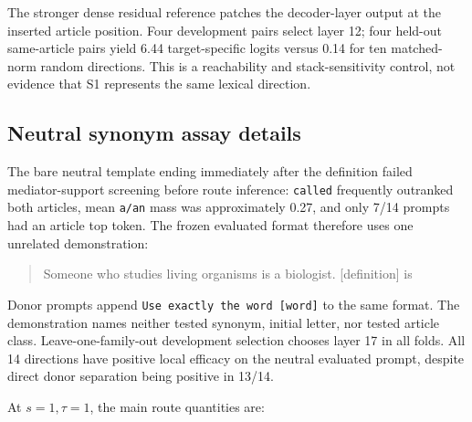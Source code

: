 \documentclass[
]{article}
\begin{document}
The stronger dense residual reference patches the decoder-layer output
at the inserted article position. Four development pairs select layer
12; four held-out same-article pairs yield 6.44 target-specific logits
versus 0.14 for ten matched-norm random directions. This is a
reachability and stack-sensitivity control, not evidence that S1
represents the same lexical direction.

\subsection{Neutral synonym assay
details}\label{neutral-synonym-assay-details}

The bare neutral template ending immediately after the definition failed
mediator-support screening before route inference: \texttt{called}
frequently outranked both articles, mean \texttt{a/an} mass was
approximately 0.27, and only 7/14 prompts had an article top token. The
frozen evaluated format therefore uses one unrelated demonstration:

\begin{quote}
Someone who studies living organisms is a biologist. {[}definition{]} is
\end{quote}

Donor prompts append \texttt{Use\ exactly\ the\ word\ {[}word{]}} to the
same format. The demonstration names neither tested synonym, initial
letter, nor tested article class. Leave-one-family-out development
selection chooses layer 17 in all folds. All 14 directions have positive
local efficacy on the neutral evaluated prompt, despite direct donor
separation being positive in 13/14.

At \(s=1,\tau=1\), the main route quantities are:
\end{document}
